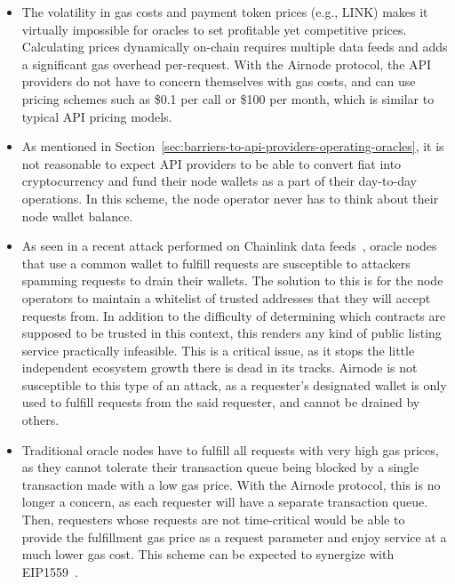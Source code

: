 \documentclass[11pt]{article}
\begin{document}
\begin{itemize}
    \item The volatility in gas costs and payment token prices (e.g., LINK) makes it virtually impossible for oracles to set profitable yet competitive prices.
    Calculating prices dynamically on-chain requires multiple data feeds and adds a significant gas overhead per-request.
    With the Airnode protocol, the API providers do not have to concern themselves with gas costs, and can use pricing schemes such as \$0.1 per call or \$100 per month, which is similar to typical API pricing models.
    \item As mentioned in Section~\ref{sec:barriers-to-api-providers-operating-oracles}, it is not reasonable to expect API providers to be able to convert fiat into cryptocurrency and fund their node wallets as a part of their day-to-day operations.
    In this scheme, the node operator never has to think about their node wallet balance.
    \item As seen in a recent attack performed on Chainlink data feeds~\cite{chainlink-gastoken}, oracle nodes that use a common wallet to fulfill requests are susceptible to attackers spamming requests to drain their wallets.
    The solution to this is for the node operators to maintain a whitelist of trusted addresses that they will accept requests from.
    In addition to the difficulty of determining which contracts are supposed to be trusted in this context, this renders any kind of public listing service practically infeasible.
    This is a critical issue, as it stops the little independent ecosystem growth there is dead in its tracks.
    Airnode is not susceptible to this type of an attack, as a requester's designated wallet is only used to fulfill requests from the said requester, and cannot be drained by others.
    \item Traditional oracle nodes have to fulfill all requests with very high gas prices, as they cannot tolerate their transaction queue being blocked by a single transaction made with a low gas price.
    With the Airnode protocol, this is no longer a concern, as each requester will have a separate transaction queue.
    Then, requesters whose requests are not time-critical would be able to provide the fulfillment gas price as a request parameter and enjoy service at a much lower gas cost.
    This scheme can be expected to synergize with EIP1559~\cite{eip1559}.
\end{itemize}
\end{document}
